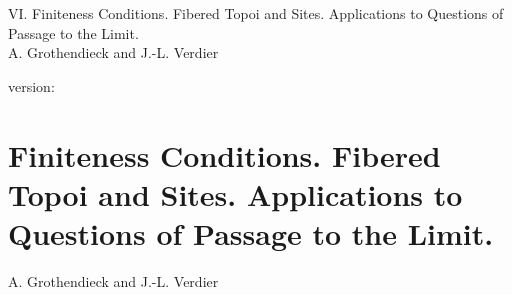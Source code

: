 \documentclass[10pt]{../fichiers-configuration-latex/smfart}
\begin{document}
\begin{center}
VI. Finiteness Conditions. Fibered Topoi and Sites. Applications
to Questions of Passage to the Limit.\\
A. Grothendieck and J.-L. Verdier
\end{center}

version: \showgitstatus
\tableofcontents

\else
\chapter[Finiteness conditions and passage to the limit]{Finiteness Conditions. Fibered Topoi and Sites. Applications
to Questions of Passage to the Limit.}
\begin{center}
A. Grothendieck and J.-L. Verdier
\end{center}
\fi
{}\label{sga4.exp.VI}


















































\end{document}
